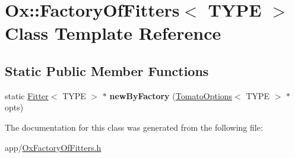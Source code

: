 \hypertarget{class_ox_1_1_factory_of_fitters}{\section{Ox\-:\-:Factory\-Of\-Fitters$<$ T\-Y\-P\-E $>$ Class Template Reference}
\label{class_ox_1_1_factory_of_fitters}
}
\subsection*{Static Public Member Functions}
\begin{DoxyCompactItemize}
\item 
\hypertarget{class_ox_1_1_factory_of_fitters_aeec858b4bf98eb6f7915ead00c3ede10}{static \hyperlink{class_ox_1_1_fitter}{Fitter}$<$ T\-Y\-P\-E $>$ $\ast$ {\bfseries new\-By\-Factory} (\hyperlink{struct_ox_1_1_tomato_options}{Tomato\-Options}$<$ T\-Y\-P\-E $>$ $\ast$opts)}\label{class_ox_1_1_factory_of_fitters_aeec858b4bf98eb6f7915ead00c3ede10}

\end{DoxyCompactItemize}


The documentation for this class was generated from the following file\-:\begin{DoxyCompactItemize}
\item 
app/\hyperlink{_ox_factory_of_fitters_8h}{Ox\-Factory\-Of\-Fitters.\-h}\end{DoxyCompactItemize}

